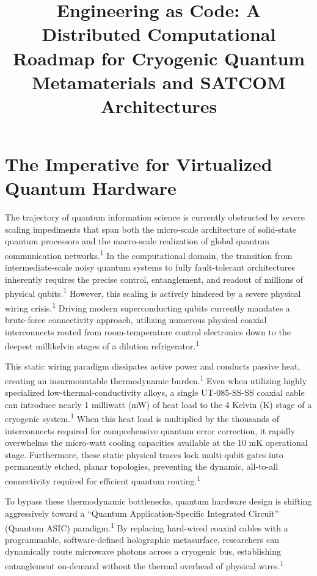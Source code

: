\documentclass[11pt, a4paper]{article}
\begin{document}
\title{\textbf{Engineering as Code: A Distributed Computational Roadmap for Cryogenic Quantum Metamaterials and SATCOM Architectures}}
\date{}
\maketitle

\section{The Imperative for Virtualized Quantum Hardware}

The trajectory of quantum information science is currently obstructed by severe scaling impediments that span both the micro-scale architecture of solid-state quantum processors and the macro-scale realization of global quantum communication networks.\textsuperscript{1} In the computational domain, the transition from intermediate-scale noisy quantum systems to fully fault-tolerant architectures inherently requires the precise control, entanglement, and readout of millions of physical qubits.\textsuperscript{1} However, this scaling is actively hindered by a severe physical wiring crisis.\textsuperscript{1} Driving modern superconducting qubits currently mandates a brute-force connectivity approach, utilizing numerous physical coaxial interconnects routed from room-temperature control electronics down to the deepest millikelvin stages of a dilution refrigerator.\textsuperscript{1}

This static wiring paradigm dissipates active power and conducts passive heat, creating an insurmountable thermodynamic burden.\textsuperscript{1} Even when utilizing highly specialized low-thermal-conductivity alloys, a single UT-085-SS-SS coaxial cable can introduce nearly 1 milliwatt (mW) of heat load to the 4 Kelvin (K) stage of a cryogenic system.\textsuperscript{1} When this heat load is multiplied by the thousands of interconnects required for comprehensive quantum error correction, it rapidly overwhelms the micro-watt cooling capacities available at the 10 mK operational stage. Furthermore, these static physical traces lock multi-qubit gates into permanently etched, planar topologies, preventing the dynamic, all-to-all connectivity required for efficient quantum routing.\textsuperscript{1}

To bypass these thermodynamic bottlenecks, quantum hardware design is shifting aggressively toward a ``Quantum Application-Specific Integrated Circuit'' (Quantum ASIC) paradigm.\textsuperscript{1} By replacing hard-wired coaxial cables with a programmable, software-defined holographic metasurface, researchers can dynamically route microwave photons across a cryogenic bus, establishing entanglement on-demand without the thermal overhead of physical wires.\textsuperscript{1}
\end{document}
